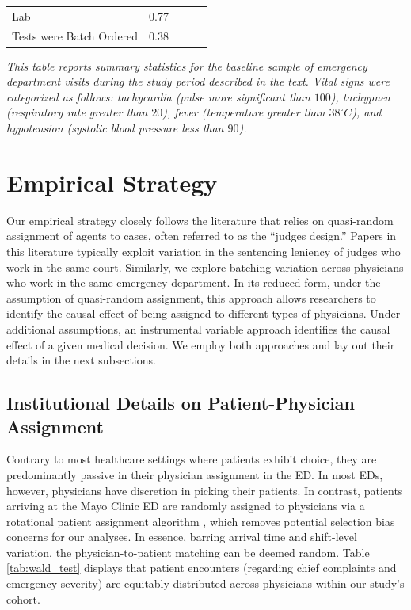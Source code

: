 \documentclass[,,nonblindrev]{informs}
\begin{document}
\begin{table}[ht]
\begin{tabular}{p{10.5cm}cccc}
Lab & 0.77 & & & \\
Tests were Batch Ordered & 0.38 & & & \\
\bottomrule
\end{tabular}
\begin{tablenotes}
\tiny
\item \textit{This table reports summary statistics for the baseline sample of emergency department visits during the study period described in the text. Vital signs were categorized as follows: tachycardia (pulse more significant than $100$), tachypnea (respiratory rate greater than $20$), fever (temperature greater than $38^\circ C$), and hypotension (systolic blood pressure less than $90$).}
\end{tablenotes}
\end{table}

\hypertarget{sec:3}{%
\section{Empirical Strategy}\label{sec:3}}

Our empirical strategy closely follows the literature that relies on
quasi-random assignment of agents to cases, often referred to as the
``judges design.'' Papers in this literature typically exploit variation
in the sentencing leniency of judges who work in the same court.
Similarly, we explore batching variation across physicians who work in
the same emergency department. In its reduced form, under the assumption
of quasi-random assignment, this approach allows researchers to identify
the causal effect of being assigned to different types of physicians.
Under additional assumptions, an instrumental variable approach
identifies the causal effect of a given medical decision. We employ both
approaches and lay out their details in the next subsections.

\hypertarget{institutional-details-on-patient-physician-assignment}{%
\subsection{Institutional Details on Patient-Physician
Assignment}\label{institutional-details-on-patient-physician-assignment}}

Contrary to most healthcare settings where patients exhibit choice, they
are predominantly passive in their physician assignment in the ED. In
most EDs, however, physicians have discretion in picking their patients.
In contrast, patients arriving at the Mayo Clinic ED are randomly
assigned to physicians via a rotational patient assignment algorithm
\citet{traub2016emergency}, which removes potential selection bias
concerns for our analyses. In essence, barring arrival time and
shift-level variation, the physician-to-patient matching can be deemed
random. Table \ref{tab:wald_test} displays that patient encounters
(regarding chief complaints and emergency severity) are equitably
distributed across physicians within our study's cohort.
\end{document}

